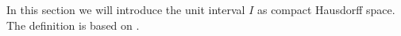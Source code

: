 In this section we will introduce the unit interval $I$ as compact Hausdorff space. 
The definition is based on \cite{Bishop}. 


%


%

%
%


%
%
%
%
